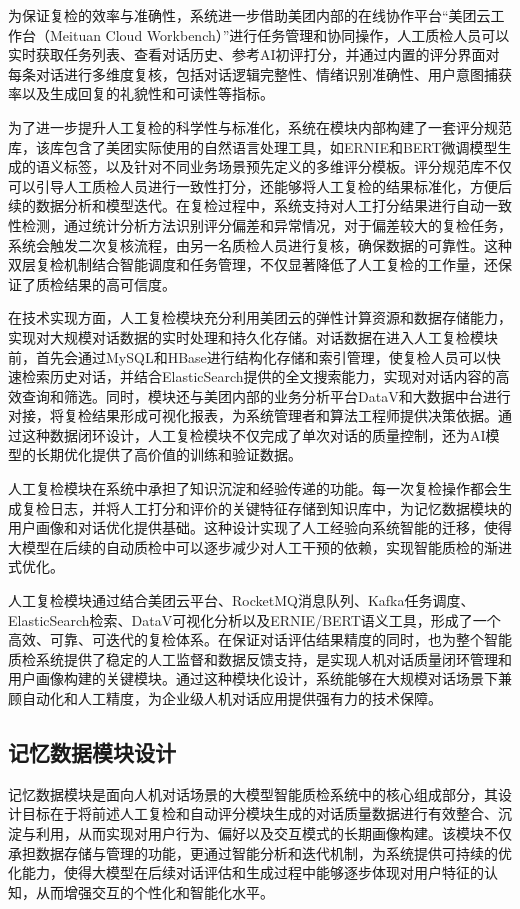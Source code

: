 为保证复检的效率与准确性，系统进一步借助美团内部的在线协作平台“美团云工作台（Meituan Cloud Workbench）”进行任务管理和协同操作，人工质检人员可以实时获取任务列表、查看对话历史、参考AI初评打分，并通过内置的评分界面对每条对话进行多维度复核，包括对话逻辑完整性、情绪识别准确性、用户意图捕获率以及生成回复的礼貌性和可读性等指标。

为了进一步提升人工复检的科学性与标准化，系统在模块内部构建了一套评分规范库，该库包含了美团实际使用的自然语言处理工具，如ERNIE和BERT微调模型生成的语义标签，以及针对不同业务场景预先定义的多维评分模板。评分规范库不仅可以引导人工质检人员进行一致性打分，还能够将人工复检的结果标准化，方便后续的数据分析和模型迭代。在复检过程中，系统支持对人工打分结果进行自动一致性检测，通过统计分析方法识别评分偏差和异常情况，对于偏差较大的复检任务，系统会触发二次复核流程，由另一名质检人员进行复核，确保数据的可靠性。这种双层复检机制结合智能调度和任务管理，不仅显著降低了人工复检的工作量，还保证了质检结果的高可信度。

在技术实现方面，人工复检模块充分利用美团云的弹性计算资源和数据存储能力，实现对大规模对话数据的实时处理和持久化存储。对话数据在进入人工复检模块前，首先会通过MySQL和HBase进行结构化存储和索引管理，使复检人员可以快速检索历史对话，并结合ElasticSearch提供的全文搜索能力，实现对对话内容的高效查询和筛选。同时，模块还与美团内部的业务分析平台DataV和大数据中台进行对接，将复检结果形成可视化报表，为系统管理者和算法工程师提供决策依据。通过这种数据闭环设计，人工复检模块不仅完成了单次对话的质量控制，还为AI模型的长期优化提供了高价值的训练和验证数据。

人工复检模块在系统中承担了知识沉淀和经验传递的功能。每一次复检操作都会生成复检日志，并将人工打分和评价的关键特征存储到知识库中，为记忆数据模块的用户画像和对话优化提供基础。这种设计实现了人工经验向系统智能的迁移，使得大模型在后续的自动质检中可以逐步减少对人工干预的依赖，实现智能质检的渐进式优化。

人工复检模块通过结合美团云平台、RocketMQ消息队列、Kafka任务调度、ElasticSearch检索、DataV可视化分析以及ERNIE/BERT语义工具，形成了一个高效、可靠、可迭代的复检体系。在保证对话评估结果精度的同时，也为整个智能质检系统提供了稳定的人工监督和数据反馈支持，是实现人机对话质量闭环管理和用户画像构建的关键模块。通过这种模块化设计，系统能够在大规模对话场景下兼顾自动化和人工精度，为企业级人机对话应用提供强有力的技术保障。
\subsection{记忆数据模块设计}
记忆数据模块是面向人机对话场景的大模型智能质检系统中的核心组成部分，其设计目标在于将前述人工复检和自动评分模块生成的对话质量数据进行有效整合、沉淀与利用，从而实现对用户行为、偏好以及交互模式的长期画像构建。该模块不仅承担数据存储与管理的功能，更通过智能分析和迭代机制，为系统提供可持续的优化能力，使得大模型在后续对话评估和生成过程中能够逐步体现对用户特征的认知，从而增强交互的个性化和智能化水平。

